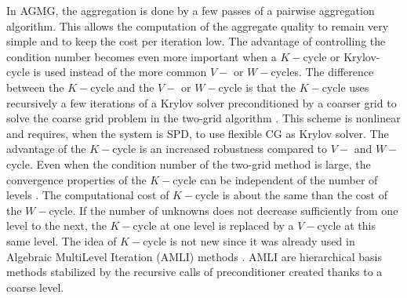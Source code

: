 In AGMG, the aggregation is done by a few passes of a pairwise aggregation 
algorithm. This allows the computation of the aggregate quality to remain very 
simple and to keep the cost per iteration low. The advantage of controlling the 
condition number becomes even more important when a $K-$cycle or Krylov-cycle is 
used instead of the more common $V-$ or $W-$cycles. The difference between the 
$K-$cycle and the $V-$ or $W-$cycle is that the $K-$cycle uses recursively a 
few iterations of a Krylov solver preconditioned by a coarser grid to solve 
the coarse grid problem in the two-grid algorithm \cite{k_cycle}. This scheme 
is nonlinear and requires, when the system is SPD, to use flexible CG 
\cite{fcg_2,fcg_3,fcg_4,fcg} as Krylov solver. The advantage of the $K-$cycle is 
an increased robustness compared to $V-$ and $W-$cycle. Even when the condition 
number of the two-grid method is large, the convergence properties of the 
$K-$cycle can be independent of the number of levels \cite{k_cycle}. The 
computational cost of $K-$cycle is about the same than the cost of the 
$W-$cycle. If the number of unknowns does not decrease sufficiently from one 
level to the next, the $K-$cycle at one level is replaced by a $V-$cycle at 
this same level. The idea of $K-$cycle is not new since it was already used 
in Algebraic MultiLevel Iteration (AMLI) methods \cite{amli}. AMLI are 
hierarchical basis methods stabilized by the recursive calls of preconditioner 
created thanks to a coarse level. 

